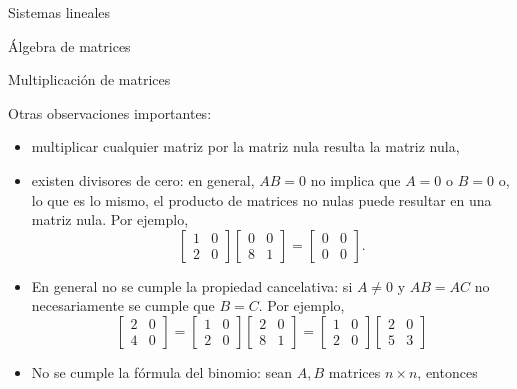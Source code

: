 \begin{chapter}{Sistemas lineales}
\begin{section}{\'Algebra de matrices}
\begin{subsection}{Multiplicaci\'on de matrices}
\begin{observacion}
                \end{observacion}

                Otras observaciones importantes: 
                
                \begin{itemize}
                    \item multiplicar cualquier matriz por la matriz nula resulta la matriz nula,
                    \item existen divisores de cero: en general, $AB = 0$ no implica que $A = 0$ o $B = 0$  o,  lo que es lo mismo, el producto de matrices no nulas puede resultar en una matriz nula. Por
                    ejemplo,
                    \begin{equation*}
                    \begin{bmatrix}1&0\\2&0\end{bmatrix} \begin{bmatrix}0&0\\8&1\end{bmatrix} = \begin{bmatrix}0&0\\0&0\end{bmatrix}.
                    \end{equation*}
                    \item En general no se cumple la propiedad cancelativa: si $A\not=0$ y  $AB = AC$ no necesariamente se cumple que $B = C$. Por
                    ejemplo,
                    \begin{equation*}
                    \begin{bmatrix}2&0\\4&0\end{bmatrix}=
                    \begin{bmatrix}1&0\\2&0\end{bmatrix} \begin{bmatrix}2&0\\8&1\end{bmatrix} =
                    \begin{bmatrix}1&0\\2&0\end{bmatrix} \begin{bmatrix}2&0\\5&3\end{bmatrix}
                    \end{equation*}
                    \item No se cumple la fórmula del binomio: 	sean $A, B$ matrices $n \times n$, entonces		

\end{itemize}
\end{subsection}
\end{section}
\end{chapter}
